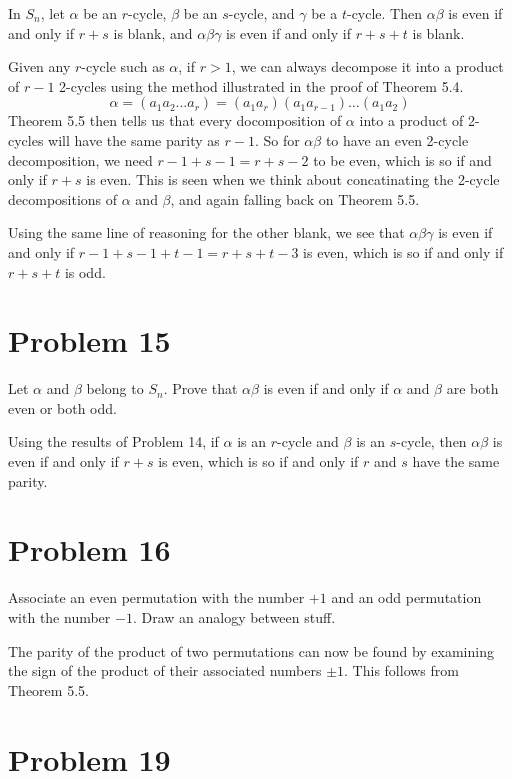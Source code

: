 \documentclass{article}
\begin{document}
In $S_n$, let $\alpha$ be an $r$-cycle, $\beta$ be an $s$-cycle, and $\gamma$ be
a $t$-cycle.  Then $\alpha\beta$ is even if and only if $r+s$ is blank, and $\alpha\beta\gamma$
is even if and only if $r+s+t$ is blank.

Given any $r$-cycle such as $\alpha$, if $r>1$,
we can always decompose it into a product of $r-1$ 2-cycles using the method
illustrated in the proof of Theorem 5.4.
\begin{equation*}
\alpha = (a_1a_2\dots a_r) = (a_1a_r)(a_1a_{r-1})\dots(a_1a_2)
\end{equation*}
Theorem 5.5 then tells us that every docomposition of $\alpha$ into a product of
2-cycles will have the same parity as $r-1$.  So for $\alpha\beta$ to have an
even 2-cycle decomposition, we need $r-1+s-1=r+s-2$ to be even, which is so if and only
if $r+s$ is even.  This is seen when we think about concatinating the 2-cycle decompositions
of $\alpha$ and $\beta$, and again falling back on Theorem 5.5.

Using the same line of reasoning for the other blank, we see that $\alpha\beta\gamma$
is even if and only if $r-1+s-1+t-1=r+s+t-3$ is even, which is so if and only if $r+s+t$
is odd.

\section*{Problem 15}

Let $\alpha$ and $\beta$ belong to $S_n$.  Prove that $\alpha\beta$ is even if and only if
$\alpha$ and $\beta$ are both even or both odd.

Using the results of Problem 14, if $\alpha$ is an $r$-cycle and $\beta$ is an $s$-cycle,
then $\alpha\beta$ is even if and only if $r+s$ is even, which is so if and only if
$r$ and $s$ have the same parity.

\section*{Problem 16}

Associate an even permutation with the number $+1$ and an odd permutation with
the number $-1$.  Draw an analogy between stuff.

The parity of the product of two permutations can now be found by examining the
sign of the product of their associated numbers $\pm 1$.  This follows from
Theorem 5.5.

\section*{Problem 19}
\end{document}
